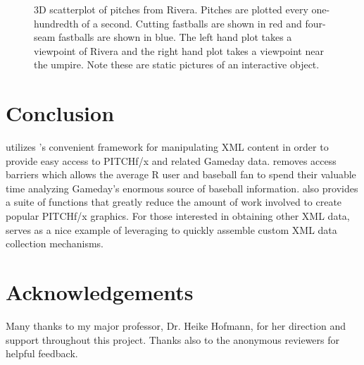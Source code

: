 \documentclass[a4paper]{report}\usepackage[]{graphicx}\usepackage[]{color}
\begin{document}
\begin{article}
\begin{figure}[h]
\caption{3D scatterplot of pitches from Rivera. Pitches are plotted every one-hundredth
of a second. Cutting fastballs are shown in red and four-seam fastballs
are shown in blue. The left hand plot takes a viewpoint of Rivera
and the right hand plot takes a viewpoint near the umpire. Note these
are static pictures of an interactive object. \label{fig:rgl}}
\end{figure}



\section{Conclusion}

 utilizes 's convenient framework for manipulating
XML content in order to provide easy access to PITCHf/x and related
Gameday data.  removes access barriers which allows
the average R user and baseball fan to spend their valuable time analyzing
Gameday's enormous source of baseball information. 
also provides a suite of functions that greatly reduce the amount
of work involved to create popular PITCHf/x graphics. For those interested
in obtaining other XML data,  serves as a nice example
of leveraging  to quickly assemble custom XML data collection
mechanisms.


\section{Acknowledgements}

Many thanks to my major professor, Dr. Heike Hofmann, for her direction
and support throughout this project. Thanks also to the anonymous
reviewers for helpful feedback.







\address{Carson Sievert\\
Department of Statistics\\
Iowa State University}\\

\end{article}
\end{document}
